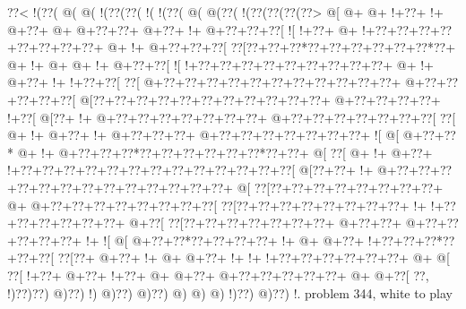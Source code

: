 \vbox{\vbox{\goo
\0??<\- !(\0??(\- @(\- @(\- !(\0??(\0??(\- !(\- !(\0??(\- @(\- @(\0??(\- !(\0??(\0??(\0??(\0??>
\- @[\- @+\- @+\- !+\0??+\- !+\- @+\0??+\- @+\- @+\0??+\0??+\- @+\0??+\- !+\- @+\0??+\0??+\0??[
\- ![\- !+\0??+\- @+\- !+\0??+\0??+\0??+\0??+\0??+\0??+\0??+\0??+\- @+\- !+\- @+\0??+\0??+\0??[
\0??[\0??+\0??+\0??*\0??+\0??+\0??+\0??+\0??+\0??*\0??+\- @+\- !+\- @+\- @+\- !+\- @+\0??+\0??[
\- ![\- !+\0??+\0??+\0??+\0??+\0??+\0??+\0??+\0??+\0??+\- @+\- !+\- @+\0??+\- !+\- !+\0??+\0??[
\0??[\- @+\0??+\0??+\0??+\0??+\0??+\0??+\0??+\0??+\0??+\0??+\0??+\- @+\0??+\0??+\0??+\0??+\0??[
\- @[\0??+\0??+\0??+\0??+\0??+\0??+\0??+\0??+\0??+\0??+\0??+\- @+\0??+\0??+\0??+\0??+\- !+\0??[
\- @[\0??+\- !+\- @+\0??+\0??+\0??+\0??+\0??+\0??+\0??+\- @+\0??+\0??+\0??+\0??+\0??+\0??+\0??[
\0??[\- @+\- !+\- @+\0??+\- !+\- @+\0??+\0??+\0??+\- @+\0??+\0??+\0??+\0??+\0??+\0??+\0??+\- ![
\- @[\- @+\0??+\0??*\- @+\- !+\- @+\0??+\0??+\0??*\0??+\0??+\0??+\0??+\0??+\0??*\0??+\0??+\- @[
\0??[\- @+\- !+\- @+\0??+\- !+\0??+\0??+\0??+\0??+\0??+\0??+\0??+\0??+\0??+\0??+\0??+\0??+\0??[
\- @[\0??+\0??+\- !+\- @+\0??+\0??+\0??+\0??+\0??+\0??+\0??+\0??+\0??+\0??+\0??+\0??+\0??+\- @[
\0??[\0??+\0??+\0??+\0??+\0??+\0??+\0??+\0??+\- @+\- @+\0??+\0??+\0??+\0??+\0??+\0??+\0??+\0??[
\0??[\0??+\0??+\0??+\0??+\0??+\0??+\0??+\0??+\- !+\- !+\0??+\0??+\0??+\0??+\0??+\0??+\- @+\0??[
\0??[\0??+\0??+\0??+\0??+\0??+\0??+\0??+\- @+\0??+\0??+\- @+\0??+\0??+\0??+\0??+\0??+\- !+\- ![
\- @[\- @+\0??+\0??*\0??+\0??+\0??+\0??+\- !+\- @+\- @+\0??+\- !+\0??+\0??+\0??*\0??+\0??+\0??[
\0??[\0??+\- @+\0??+\- !+\- @+\- @+\0??+\- !+\- !+\- !+\0??+\0??+\0??+\0??+\0??+\0??+\- @+\- @[
\0??[\- !+\0??+\- @+\0??+\- !+\0??+\- @+\- @+\0??+\- @+\0??+\0??+\0??+\0??+\0??+\- @+\- @+\0??[
\0??,\- !)\0??)\0??)\- @)\0??)\- !)\- @)\0??)\- @)\0??)\- @)\- @)\- @)\- !)\0??)\- @)\0??)\- !.
}
\hfil problem 344, white to play\hfil\break
}

